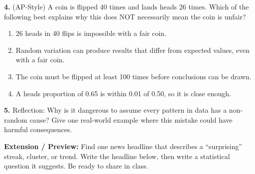 \documentclass[10pt]{article}
\begin{document}
\begin{practicebox}
\vspace{8pt}
\textbf{4.} (AP-Style) A coin is flipped 40 times and lands heads 26 times. Which
of the following best explains why this does NOT necessarily mean the coin is unfair?

\begin{enumerate}[label=(\Alph*), leftmargin=2em, itemsep=4pt]
  \item 26 heads in 40 flips is impossible with a fair coin.
  \item Random variation can produce results that differ from expected values, even with a
        fair coin.
  \item The coin must be flipped at least 100 times before conclusions can be drawn.
  \item A heads proportion of 0.65 is within 0.01 of 0.50, so it is close enough.
\end{enumerate}

\vspace{8pt}
\textbf{5.} Reflection: Why is it dangerous to assume every pattern in data has a
non-random cause? Give one real-world example where this mistake could have harmful
consequences.\\[6pt]
\writeline\writeline\writeline

\vspace{8pt}
\textbf{Extension / Preview:} Find one news headline that describes a ``surprising''
streak, cluster, or trend. Write the headline below, then write a statistical question
it suggests. Be ready to share in class.\\[6pt]
\writeline\writeline\writeline
\end{practicebox}
\end{document}
